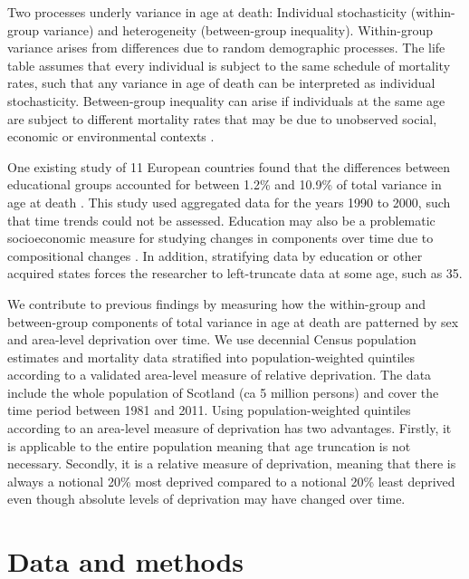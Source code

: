 \documentclass[12pt,oneside,a4paper]{article} %
\theoremstyle{definition}
\begin{document}
Two processes underly variance in age at death: Individual
stochasticity (within-group variance) and heterogeneity (between-group
inequality). Within-group variance arises from differences due to random
demographic processes. The life table assumes that every individual is subject
to the same schedule of mortality rates, such that any
variance in age of death can be interpreted as individual stochasticity. Between-group inequality can arise if individuals at the same age are subject to different mortality rates that may be due to unobserved social, economic or environmental contexts \citep{Hartemink2017}.

One existing study of 11 European countries found that the differences between
educational groups accounted for between 1.2\% and 10.9\% of total variance in
age at death \citep{Raalte2012}. This study used aggregated data for the
years 1990 to 2000, such that time trends could not be assessed. Education may
also be a problematic socioeconomic measure for studying changes in components
over time due to compositional changes \citep{Hendi2015}.  In addition, stratifying data by
education or other acquired states forces the researcher to left-truncate data
at some age, such as 35.
 
We contribute to previous findings by measuring how the within-group and
between-group components of total variance in age at death are patterned by sex
and area-level deprivation over time. We use decennial Census population
estimates and mortality data stratified into population-weighted quintiles
according to a validated area-level measure of relative deprivation. The data
include the whole population of Scotland (ca 5 million persons) and cover the
time period between 1981 and 2011. Using population-weighted quintiles according
to an area-level measure of deprivation has two advantages. Firstly, it is applicable to the entire population meaning that age truncation is not necessary. Secondly, it is a relative measure of deprivation, meaning that there is always a notional 20\% most deprived compared to a notional 20\% least deprived even though absolute levels of deprivation may have changed over time.



\section{Data and methods}
\end{document}
